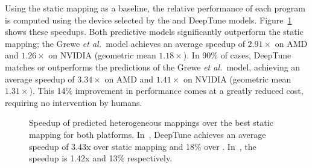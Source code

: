 Using the static mapping as a baseline, the relative performance of each program is computed using the device selected by the \citeauthor{Grewe2013} and DeepTune models. Figure~\ref{fig:cgo-speedup} shows these speedups. Both predictive models significantly outperform the static mapping; the Grewe \emph{et al.\ }model achieves an average speedup of $2.91\times$ on AMD and $1.26\times$ on NVIDIA (geometric mean $1.18\times$). In 90\% of cases, DeepTune matches or outperforms the predictions of the Grewe \emph{et al.\ }model, achieving an average speedup of $3.34\times$ on AMD and $1.41\times$ on NVIDIA (geometric mean $1.31\times$). This 14\% improvement in performance comes at a greatly reduced cost, requiring no intervention by humans.


\begin{figure}
  \centering %
  \caption[Speedup of predicted heterogeneous mappings]{%
    Speedup of predicted heterogeneous mappings over the best static mapping for both platforms. In~, DeepTune achieves an average speedup of 3.43x over static mapping and 18\% over \citeauthor{Grewe2013}. In~, the speedup is 1.42x and 13\% respectively.%
  }
  \label{fig:cgo-speedup}
\end{figure}
